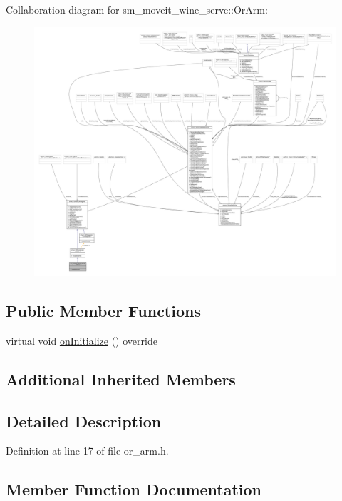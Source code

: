 Collaboration diagram for sm\+\_\+moveit\+\_\+wine\+\_\+serve\+:\+:Or\+Arm\+:
\nopagebreak
\begin{figure}[H]
\begin{center}
\leavevmode
\includegraphics[width=350pt]{classsm__moveit__wine__serve_1_1OrArm__coll__graph}
\end{center}
\end{figure}
\subsection*{Public Member Functions}
\begin{DoxyCompactItemize}
\item 
virtual void \hyperlink{classsm__moveit__wine__serve_1_1OrArm_a859764a8929a4a8fbfdfbba4af8bdbee}{on\+Initialize} () override
\end{DoxyCompactItemize}
\subsection*{Additional Inherited Members}


\subsection{Detailed Description}


Definition at line 17 of file or\+\_\+arm.\+h.



\subsection{Member Function Documentation}
\mbox{\label{classsm__moveit__wine__serve_1_1OrArm_a859764a8929a4a8fbfdfbba4af8bdbee}} 
